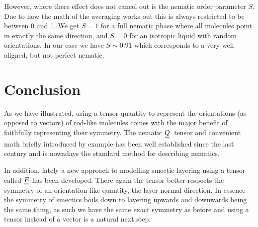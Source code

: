 \documentclass[a4paper,11pt]{article}
\newcommand{\duf}[2]{\stackunder[0.5pt]{\stackunder[0.8pt]{\stackunder[1pt]{\ensuremath{#1}}{\rule{\widthof{\ensuremath{#2}}*\real{0.9}}{.1ex}}}{\rule{\widthof{\ensuremath{#2}}*\real{0.9}}{.1ex}}}{}}
\newcommand{\du}[1]{\duf{#1}{#1}}
\newcommand{\QQ}{\ensuremath{\du{Q}}}
\begin{document}
\begin{multicols}{2}
    However, where there effect does not cancel out is the nematic order parameter $S$.
    Due to how the math of the averaging works out this is always restricted to be between 0 and 1.
    We get $S=1$ for a full nematic phase where all molecules point in exactly the same direction, and $S=0$ for an isotropic liquid with random orientations.
    In our case we have $S\sim0.91$ which corresponds to a very well aligned, but not perfect nematic.

    \section*{Conclusion}
    As we have illustrated, using a tensor quantity to represent the orientations (as opposed to vectors) of rod-like molecules comes with the major benefit of faithfully representing their symmetry.
    The nematic \QQ\ tensor and convenient math briefly introduced by example has been well established since the last century and is nowadays the standard method for describing nematics.

    In addition, lately a new approach to modelling smectic layering using a tensor called $\du{E}$ has been developed.
    There again the tensor better respects the symmetry of an orientation-like quantity, the layer normal direction.
    In essence the symmetry of smectics boils down to layering upwards and downwards being the same thing, as such we have the same exact symmetry as before and using a tensor instead of a vector is a natural next step.


\end{multicols}



\end{document}
